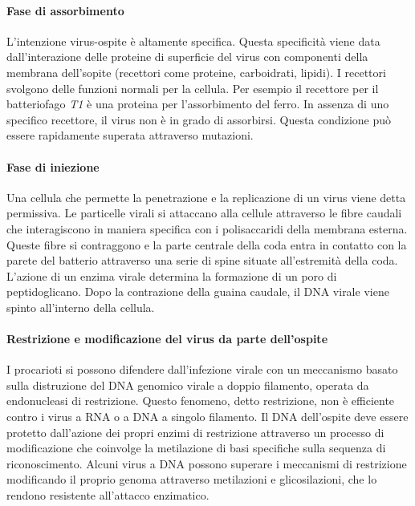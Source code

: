 			\paragraph{Fase di assorbimento}
			L'intenzione virus-ospite è altamente specifica. 
			Questa specificità viene data dall'interazione delle proteine di superficie del virus con componenti della membrana dell'sopite (recettori come proteine, carboidrati, lipidi). 
			I recettori svolgono delle funzioni normali per la cellula. 
			Per esempio il recettore per il batteriofago \emph{T1} è una proteina per l'assorbimento del ferro. 
			In assenza di uno specifico recettore, il virus non è in grado di assorbirsi.
			Questa condizione pu\`o essere rapidamente superata attraverso mutazioni.

			\paragraph{Fase di iniezione}
			Una cellula che permette la penetrazione e la replicazione di un virus viene detta permissiva. 
			Le particelle virali si attaccano alla cellule attraverso le fibre caudali che interagiscono in maniera specifica con i polisaccaridi della membrana esterna. 
			Queste fibre si contraggono e la parte centrale della coda entra in contatto con la parete del batterio attraverso una serie di spine situate all'estremità della coda. 
			L'azione di un enzima virale determina la formazione di un poro di peptidoglicano. 
			Dopo la contrazione della guaina caudale, il DNA virale viene spinto all'interno della cellula.

			\paragraph{Restrizione e modificazione del virus da parte dell'ospite}
			I procarioti si possono difendere dall'infezione virale con un meccanismo basato sulla distruzione del DNA genomico virale a doppio filamento, operata da endonucleasi di restrizione. 
			Questo fenomeno, detto restrizione, non è efficiente contro i virus a RNA o a DNA a singolo filamento. 
			Il DNA dell'ospite deve essere protetto dall'azione dei propri enzimi di restrizione attraverso un processo di modificazione che coinvolge la metilazione di basi specifiche sulla sequenza di riconoscimento. 
			Alcuni virus a DNA possono superare i meccanismi di restrizione modificando il proprio genoma attraverso metilazioni e glicosilazioni, che lo rendono resistente all'attacco enzimatico.

